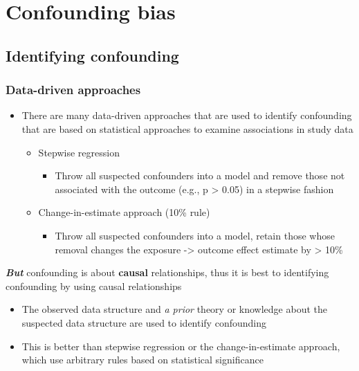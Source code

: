 \documentclass[
]{book}
\providecommand{\tightlist}{%
  \setlength{\itemsep}{0pt}\setlength{\parskip}{0pt}}
\begin{document}
\hypertarget{confounding}{%
\chapter{Confounding bias}\label{confounding}}

\hypertarget{identifying-confounding}{%
\section{Identifying confounding}\label{identifying-confounding}}

\hypertarget{data-driven-approaches}{%
\subsection{Data-driven approaches}\label{data-driven-approaches}}

\begin{itemize}
\tightlist
\item
  There are many data-driven approaches that are used to identify confounding that are based on statistical approaches to examine associations in study data

  \begin{itemize}
  \tightlist
  \item
    Stepwise regression

    \begin{itemize}
    \tightlist
    \item
      Throw all suspected confounders into a model and remove those not associated with the outcome (e.g., p \textgreater{} 0.05) in a stepwise fashion
    \end{itemize}
  \item
    Change-in-estimate approach (10\% rule)

    \begin{itemize}
    \tightlist
    \item
      Throw all suspected confounders into a model, retain those whose removal changes the exposure -\textgreater{} outcome effect estimate by \textgreater{} 10\%
    \end{itemize}
  \end{itemize}
\end{itemize}

\textbf{\emph{But}} confounding is about \textbf{causal} relationships, thus it is best to identifying confounding by using causal relationships

\begin{itemize}
\tightlist
\item
  The observed data structure and \emph{a prior} theory or knowledge about the suspected data structure are used to identify confounding
\item
  This is better than stepwise regression or the change-in-estimate approach, which use arbitrary rules based on statistical significance
\end{itemize}
\end{document}
